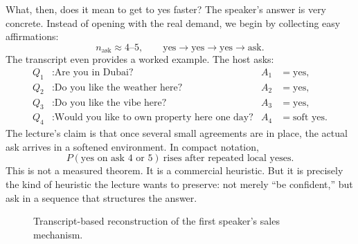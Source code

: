 What, then, does it mean to get to yes faster? The speaker's answer is very concrete. Instead of opening with the real demand, we begin by collecting easy affirmations:
\begin{equation}
n_{\text{ask}} \approx 4\text{--}5,
\qquad
\text{yes} \to \text{yes} \to \text{yes} \to \text{ask}.
\end{equation}
The transcript even provides a worked example. The host asks:
\begin{align}
Q_1 &: \text{Are you in Dubai?} & A_1 &= \text{yes}, \\
Q_2 &: \text{Do you like the weather here?} & A_2 &= \text{yes}, \\
Q_3 &: \text{Do you like the vibe here?} & A_3 &= \text{yes}, \\
Q_4 &: \text{Would you like to own property here one day?} & A_4 &= \text{soft yes}.
\end{align}
The lecture's claim is that once several small agreements are in place, the actual ask arrives in a softened environment. In compact notation,
\begin{equation}
P(\text{yes on ask }4\text{ or }5)\ \text{rises after repeated local yeses}.
\end{equation}
This is not a measured theorem. It is a commercial heuristic. But it is precisely the kind of heuristic the lecture wants to preserve: not merely ``be confident,'' but ask in a sequence that structures the answer.

\begin{figure}[h]
\centering
{}
\caption{Transcript-based reconstruction of the first speaker's sales mechanism.}
\end{figure}

